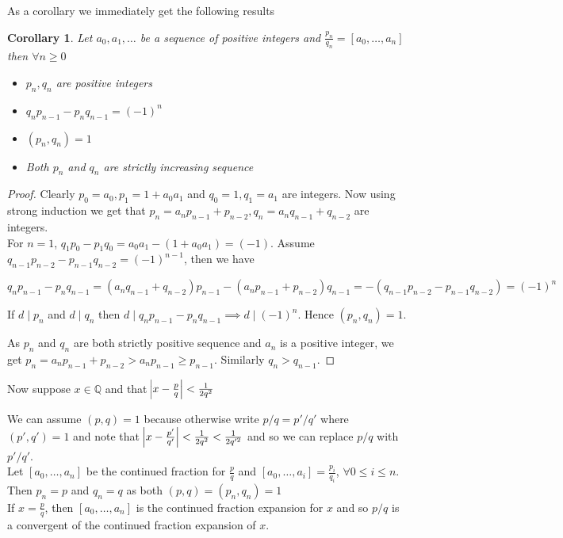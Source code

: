 \documentclass{article}
\newtheorem*{corollary}{Corollary}
\begin{document}
As a corollary we immediately get the following results
\begin{corollary}
Let $a_0, a_1, \ldots$ be a sequence of positive integers and $\frac{p_n}{q_n} = [a_0, \ldots, a_n]$ then $\forall n\geq 0$
\begin{itemize}
    \item $p_n, q_n$ are positive integers
    \item $q_n p_{n-1} - p_n q_{n-1} = (-1)^n$
    \item $(p_n, q_n) = 1$
    \item Both $p_n$ and $q_n$ are strictly increasing sequence
\end{itemize}
\end{corollary}

\begin{proof}
Clearly $p_0 = a_0, p_1 = 1 + a_0a_1$ and $q_0 = 1, q_1 = a_1$ are integers. Now using strong induction we get that $p_n = a_np_{n-1} + p_{n-2}, q_n = a_nq_{n-1} + q_{n-2}$ are integers. \\

For $n=1$, $q_1 p_0 - p_1 q_0 = a_0a_1 - (1 + a_0a_1) = (-1)$. Assume $q_{n-1} p_{n-2} - p_{n-1} q_{n-2} = (-1)^{n-1}$, then we have

$$q_n p_{n-1} - p_n q_{n-1} = (a_n q_{n-1} + q_{n-2})p_{n-1} - (a_n p_{n-1} + p_{n-2})q_{n-1} = -(q_{n-1} p_{n-2} - p_{n-1} q_{n-2}) = (-1)^n$$

If $d \mid p_n$ and $d \mid q_n$ then $d \mid q_n p_{n-1} - p_n q_{n-1} \implies d \mid (-1)^n$. Hence $(p_n, q_n) = 1$.

As $p_n$ and $q_n$ are both strictly positive sequence and $a_n$ is a positive integer, we get $p_n = a_n p_{n-1} + p_{n-2} > a_n p_{n-1} \geq p_{n-1}$. Similarly $q_n > q_{n-1}$.
\end{proof}

Now suppose $x \in \mathbb{Q}$ and that $\abs{x - \frac{p}{q}} < \frac{1}{2q^2}$ 

We can assume $(p,q) = 1$ because otherwise write $p/q = p'/q'$ where $(p', q') = 1$ and note that $\abs{x - \frac{p'}{q'}} < \frac{1}{2q^2} < \frac{1}{2q'^2}$ and so we can replace $p/q$ with $p'/q'$. \\

Let $[a_0, \ldots, a_n]$ be the continued fraction for $\frac{p}{q}$ and $[a_0, \ldots, a_i] = \frac{p_i}{q_i}$, $\forall 0 \leq i \leq n$. Then $p_n = p$ and $q_n = q$ as both $(p,q) = (p_n,q_n) = 1$ \\

If $x = \frac{p}{q}$, then $[a_0, \ldots, a_n]$ is the continued fraction expansion for $x$ and so $p/q$ is a convergent of the continued fraction expansion of $x$.
\end{document}
